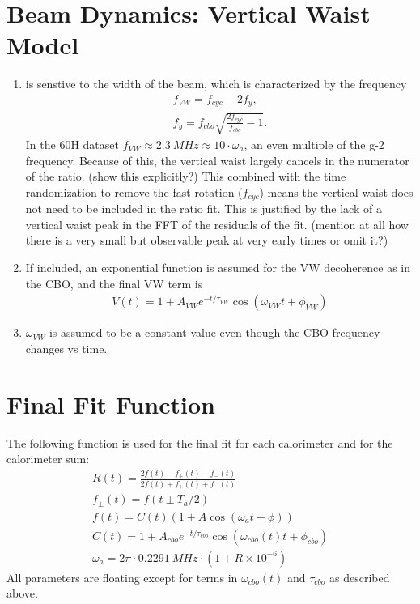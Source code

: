 \section{Beam Dynamics: Vertical Waist Model}

	\begin{enumerate}
		\item{\wa is senstive to the width of the beam, which is characterized by the frequency 
			\begin{gather}
				f_{VW} = f_{cyc} - 2f_{y}, \\
				f_{y} = f_{cbo} \sqrt{\frac{2f_{cyc}}{f_{cbo}} - 1}.
			\end{gather}
		In the 60H dataset $f_{VW} \approx \SI{2.3}{MHz} \approx 10 \cdot \omega_{a}$, an even multiple of the g-2 frequency. Because of this, the vertical waist largely cancels in the numerator of the ratio. (show this explicitly?) This combined with the time randomization to remove the fast rotation ($f_{cyc}$) means the vertical waist does not need to be included in the ratio fit. This is justified by the lack of a vertical waist peak in the FFT of the residuals of the fit. (mention at all how there is a very small but observable peak at very early times or omit it?)
		}
		\item{If included, an exponential function is assumed for the VW decoherence as in the CBO, and the final VW term is 
			\begin{gather}
					V(t) = 1 + A_{VW} e^{-t/\tau_{VW}} \cos(\omega_{VW}t + \phi_{VW})
			\end{gather}
		}
		\item{$\omega_{VW}$ is assumed to be a constant value even though the CBO frequency changes vs time.}
	\end{enumerate}


\section{Final Fit Function}

	The following function is used for the final fit for each calorimeter and for the calorimeter sum:
	\begin{gather}
			R(t) = \frac{2f(t) - f_{+}(t) - f_{-}(t)}{2f(t) + f_{+}(t) + f_{-}(t)} \\[10pt]
			f_{\pm}(t) = f(t \pm T_{a}/2) \\[10pt]
			f(t) = C(t) (1 + A \cos(\omega_{a}t + \phi)) \\[10pt]
			C(t) = 1 + A_{cbo} e^{-t/\tau_{cbo}} \cos(\omega_{cbo}(t)t + \phi_{cbo}) \\[10pt]
			\omega_{a} = 2 \pi \cdot \SI{0.2291}{MHz} \cdot (1 + R \times 10^{-6})
	\end{gather}
	All parameters are floating except for terms in $\omega_{cbo}(t)$ and $\tau_{cbo}$ as described above.




